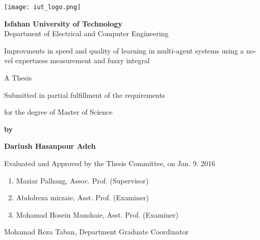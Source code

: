 \thispagestyle{empty}
\begin{latin}
\begin{center}
\texttt{[image: iut\_logo.png]}
\vspace{0.4cm}

{\large\textbf{Isfahan University of Technology}}\\

\vspace{0.4cm}
Department of Electrical and Computer Engineering

\vspace{2.5cm}

{\Huge Improvments in speed and quality of learning in multi-agent systems using a novel expertness measurement and fuzzy integral}

\vspace{1.5cm}

{\large
	A Thesis
	
	\vspace{.3cm}
	
	Submitted in partial fulfillment of the requirements
	
	\vspace{.3cm}
	
	for the degree of Master of Science
}

	\vspace{1.5cm}

{\Large
	\textbf{by}
	
	\vspace{.3cm}
	
	\textbf{Dariush Hasanpour Adeh}
}
\end{center}

\vfill

Evaluated and Approved by the Thesis Committee, on Jan. 9. 2016
\vspace{0.5cm}

\begin{enumerate}
\item Maziar Palhang, Assoc. Prof. (Supervisor)
\vspace{0.5cm}

\item Abdolreza mirzaie, Asst. Prof. (Examiner)
\vspace{0.5cm}

\item Mohamad Hosein Manshaie, Asst. Prof. (Examiner)
\vspace{0.5cm}

\end{enumerate}

Mohamad Reza Taban, Department Graduate Coordinator

\pagebreak
\end{latin}

\thispagestyle{empty}
\mbox{}

